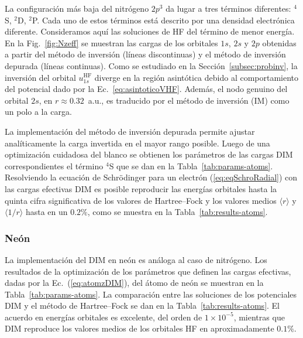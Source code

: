 La configuración más baja del nitrógeno $2p^3$ da lugar a tres términos 
diferentes: $^4$S, $^2$D, $^2$P. Cada uno de estos términos está 
descrito por una densidad electrónica diferente. Consideramos aquí 
las soluciones de HF del término de menor energía. En la  
Fig.~\ref{fig:Nzeff} se muestran las cargas de los orbitales $1s$, $2s$ 
y $2p$ obtenidas a partir del método de inversión (líneas discontinuas) 
y el método de inversión depurada (líneas continuas). Como se estudiado 
en la Sección~\ref{subsec:probinv}, la inversión del orbital 
$u_{1s}^{\mathrm{HF}}$ diverge en la región asintótica debido al 
comportamiento del potencial dado por la Ec.~\ref{eq:asintoticoVHF}. 
Además, el nodo genuino del orbital $2s$, en $r\approx 0.32$~a.u., es 
traducido por el método de inversión (IM) como un polo a la carga. 

La implementación del método de inversión depurada permite ajustar 
analíticamente la carga invertida en el mayor rango posible. Luego de 
una optimización cuidadosa del blanco se obtienen los parámetros de las 
cargas DIM correspondientes el término $^4$S que se dan en la 
Tabla~\ref{tab:params-atoms}. Resolviendo la ecuación de Schr\"odinger 
para un electrón (\ref{eq:eqSchroRadial}) con las cargas efectivas DIM 
es posible reproducir las energías orbitales hasta la quinta cifra 
significativa de los valores de Hartree--Fock y los valores medios 
$\langle r \rangle$ y $\langle 1/r \rangle$ hasta en un $0.2\%$, como se 
muestra en la Tabla~\ref{tab:results-atoms}.  


\subsubsection*{Neón}

La implementación del DIM en neón es análoga al caso de nitrógeno. Los 
resultados de la optimización de los parámetros que definen las cargas 
efectivas, dadas por la Ec.~(\ref{eq:atomzDIM}), del átomo de neón se 
muestran en la Tabla~\ref{tab:params-atoms}. La comparación entre las 
soluciones de los potenciales DIM y el método de Hartree--Fock se dan en 
la Tabla~\ref{tab:results-atoms}. El acuerdo en energías orbitales es 
excelente, del orden de $1\times 10^{-5}$, mientras que DIM reproduce 
los valores medios de los orbitales HF en aproximadamente $0.1\%$. 

